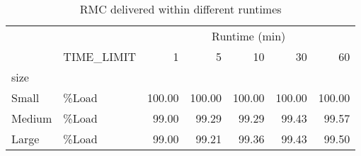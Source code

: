 \begin{table}[htb]
\centering
\caption{RMC delivered within different runtimes}
\label{tab:runtime}
\begin{tabular}{llrrrrr}
\toprule
 &  & \multicolumn{5}{c}{Runtime (min)} \\
 & TIME_LIMIT & 1 & 5 & 10 & 30 & 60 \\
size &  &  &  &  &  &  \\
\midrule
Small & \%Load & 100.00 & 100.00 & 100.00 & 100.00 & 100.00 \\
Medium & \%Load & 99.00 & 99.29 & 99.29 & 99.43 & 99.57 \\
Large & \%Load & 99.00 & 99.21 & 99.36 & 99.43 & 99.50 \\
\bottomrule
\end{tabular}
\end{table}
